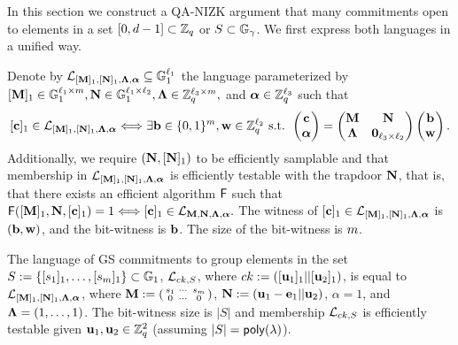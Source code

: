 
In this section we construct a QA-NIZK argument that many commitments open to elements in a set $[0,d-1] \subset \mathbb{Z}_q$ or  $S \subset \mathbb{G}_{\gamma}$. We first express both languages in a unified way. 


\begin{definition}
Denote by $\mathcal{L}_{[\mathbf{{M}}]_1,[\mathbf{{N}}]_1,\mathbf{{\Lambda}},{\boldsymbol \alpha}}\subseteq\mathbb{G}_1^{\ell_1}$ the language parameterized by $[\mathbf{{M}}]_1 \in\mathbb{G}_1^{{\ell_1}\times {m}},\mathbf{{N}}\in\mathbb{G}_1^{{\ell_1}\times {\ell_2}},\mathbf{{\Lambda}}\in\mathbb{Z}_q^{{\ell_3}\times{m}},$ and ${\boldsymbol \alpha}\in\mathbb{Z}_q^{\ell_3}$ such that
\begin{equation}\label{eq:definition1}
[\mathbf{c}]_1\in\mathcal{L}_{[\mathbf{{M}}]_1,[\mathbf{{N}}]_1,\mathbf{{\Lambda}},{\boldsymbol \alpha}} \Longleftrightarrow \exists \mathbf{b}\in\{0,1\}^{m},\mathbf{w}\in\mathbb{Z}_q^{\ell_2} \text{ s.t. }
\left(\begin{matrix}
    \mathbf{c}\\
    {\boldsymbol \alpha}
\end{matrix}\right)
=
\begin{pmatrix}
    \mathbf{{M}}       & \mathbf{{N}}\\
    \mathbf{{\Lambda}} & \mathbf{{0}}_{{\ell_3}\times {\ell_2}}
\end{pmatrix}
\left(\begin{matrix}
    \mathbf{b}\\
    \mathbf{w}
\end{matrix}\right).
\end{equation}
Additionally, we require $(\mathbf{{N}},[\mathbf{{N}}]_1)$ to be efficiently samplable and that membership in $\mathcal{L}_{[\mathbf{{M}}]_1,[\mathbf{{N}}]_1,\mathbf{{\Lambda}},{\boldsymbol \alpha}}$ is efficiently testable with the trapdoor $\mathbf{{N}}$, that is, that there exists an efficient algorithm $\mathsf{F}$ such that $\mathsf{F}([\mathbf{{M}}]_1,\mathbf{{N}},[\mathbf{c}]_1)=1\Longleftrightarrow [\mathbf{c}]_1\in\mathcal{L}_{\mathbf{{M}},\mathbf{{N}},\mathbf{{\Lambda}},{\boldsymbol \alpha}}.$ The witness of 
$[\mathbf{c}]_1\in\mathcal{L}_{[\mathbf{{M}}]_1,[\mathbf{{N}}]_1,\mathbf{{\Lambda}},{\boldsymbol \alpha}}$ is $(\mathbf{b},\mathbf{w})$, and the bit-witness is $\mathbf{b}$. The size of the bit-witness is ${m}$. 
\end{definition}

\begin{example}
The language of GS commitments to group elements in the set $S:=\{[s_1]_1,\ldots,[s_{m}]_1\} \subset \mathbb{G}_1$, $\mathcal{L}_{ck,S}$, where $ck:=([\mathbf{u}_1]_1||[\mathbf{u}_2]_1)$, is equal to $\mathcal{L}_{[\mathbf{{M}}]_1,[\mathbf{{N}}]_1,\mathbf{{\Lambda}},{\boldsymbol \alpha}}$, where
$\mathbf{{M}}:=\left(\begin{smallmatrix}s_1 & \cdots & s_{m} \\ 0 &\cdots & 0\end{smallmatrix}\right)$, $\mathbf{{N}}:=(\mathbf{u}_1-\mathbf{e}_1||\mathbf{u}_2)$, $\alpha=1$, and $\mathbf{{\Lambda}}=(1,\ldots,1)$. The bit-witness size is $|S|$ and membership $\mathcal{L}_{ck,S}$ is efficiently testable given $\mathbf{u}_1,\mathbf{u}_2 \in \mathbb{Z}_q^2$ (assuming $|S|=\mathsf{poly}(\lambda)$). 
\end{example}

